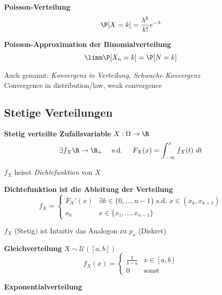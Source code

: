  \textbf{Poisson-Verteilung}\\
$$
    \P[X=k] = \frac{\lambda^k}{k!}e^{-\lambda}
$$

\theorem \textbf{Poisson-Approximation der Binomialverteilung}\\
$$
    \limn \P[X_n=k] = \P[N=k]
$$

\scriptsize

\remark Auch genannt: \textit{Konvergenz in Verteilung, Schwache Konvergenz}\\
\color{gray}
Convergence in distribution/law, weak convergence
\color{black}

\normalsize

\newpage

\subsection{Stetige Verteilungen}

 \textbf{Stetig verteilte Zufallsvariable} $X: \Omega \to \R$\\
$$
    \exists f_X \R \to \R_+ \quad\text{ s.d. }\quad F_X(x) = \int_{-\infty}^{x}f_X(t)\ dt
$$

{\scriptsize
    \remark $f_X$ heisst \textit{Dichtefunktion} von $X$
}

\theorem \textbf{Dichtefunktion ist die Ableitung der Verteilung}
$$
    f_X = \begin{cases}
        F_X'(x) & \exists k \in \{0,\ldots,n-1\} \text{ s.d. } x \in (x_k,x_{k+1}) \\
        a_k     & x \in \{x_1,\ldots,x_{n-1}\}
    \end{cases}
$$

{\scriptsize
    \remark $f_X$ (Stetig) ist Intuitiv das Analogon zu $p_x$ (Diskret)
}

 \textbf{Gleichverteilung} $X \sim \mathcal{U}([a,b])$\\
$$
    f_X(x) = \begin{cases}
        \frac{1}{b-a}   & x \in [a,b] \\
        0               & \text{sonst}
    \end{cases}
$$

 \textbf{Exponentialverteilung}
